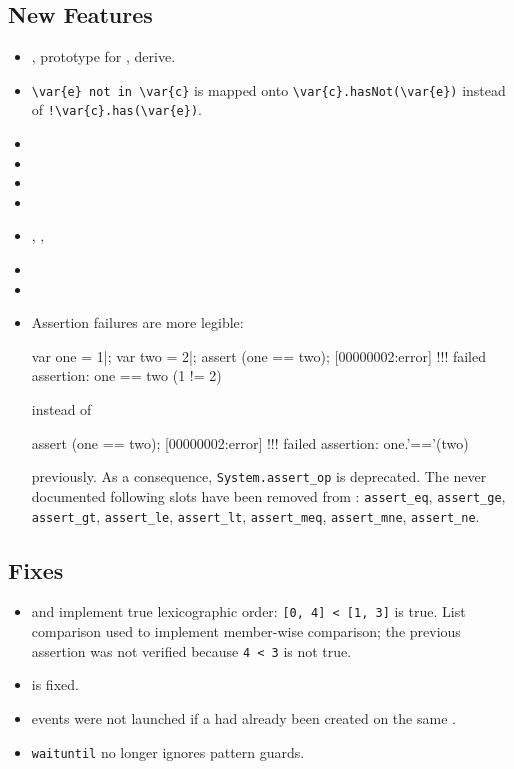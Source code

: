 \subsection{New Features}
\begin{itemize}
\item {}, prototype for ,
   derive.
\item \lstinline|\var{e} not in \var{c}| is mapped onto
  \lstinline|\var{c}.hasNot(\var{e})| instead of
  \lstinline|!\var{c}.has(\var{e})|.
\item {}
\item {}
\item {}
\item {}
\item {}, , 
\item {}
\item {}
\item Assertion failures are more legible:

\begin{urbiscript}
var one = 1|;
var two = 2|;
assert (one == two);
[00000002:error] !!! failed assertion: one == two (1 != 2)
\end{urbiscript}

  \noindent
  instead of

\begin{urbiunchecked}
assert (one == two);
[00000002:error] !!! failed assertion: one.'=='(two)
\end{urbiunchecked}
  \noindent
  previously.  As a consequence, \lstinline{System.assert_op} is deprecated.
  The never documented following slots have been removed from
  : \lstinline{assert_eq}, \lstinline{assert_ge},
  \lstinline{assert_gt}, \lstinline{assert_le}, \lstinline{assert_lt},
  \lstinline{assert_meq}, \lstinline{assert_mne}, \lstinline{assert_ne}.
\end{itemize}

\subsection{Fixes}
\begin{itemize}
\item {} and  implement true
  lexicographic order: \lstinline|[0, 4] < [1, 3]| is true.  List comparison
  used to implement member-wise comparison; the previous assertion was not
  verified because \lstinline|4 < 3| is not true.
\item {} is fixed.
\item {} events were not launched if a
   had already been created on the same
  .
\item \lstinline{waituntil} no longer ignores pattern guards.
\end{itemize}

